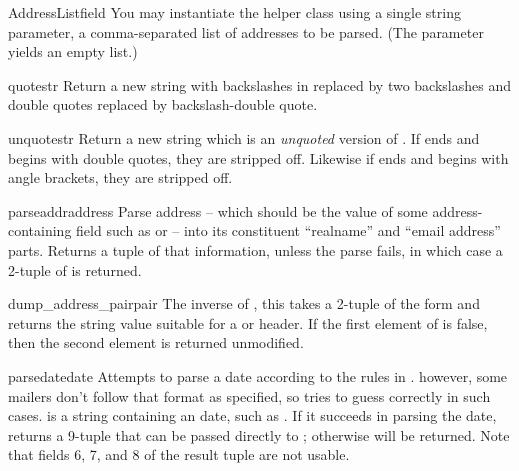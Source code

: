 \begin{classdesc}{AddressList}{field}
You may instantiate the  helper class using a single
string parameter, a comma-separated list of  addresses to be
parsed.  (The parameter  yields an empty list.)
\end{classdesc}

\begin{funcdesc}{quote}{str}
Return a new string with backslashes in  replaced by two
backslashes and double quotes replaced by backslash-double quote.
\end{funcdesc}

\begin{funcdesc}{unquote}{str}
Return a new string which is an \emph{unquoted} version of .
If  ends and begins with double quotes, they are stripped
off.  Likewise if  ends and begins with angle brackets, they
are stripped off.
\end{funcdesc}

\begin{funcdesc}{parseaddr}{address}
Parse address -- which should be the value of some address-containing
field such as  or  -- into its constituent
``realname'' and ``email address'' parts.  Returns a tuple of that
information, unless the parse fails, in which case a 2-tuple of
 is returned.
\end{funcdesc}

\begin{funcdesc}{dump_address_pair}{pair}
The inverse of , this takes a 2-tuple of the form
 and returns the string value suitable
for a  or  header.  If the first element of
 is false, then the second element is returned unmodified.
\end{funcdesc}

\begin{funcdesc}{parsedate}{date}
Attempts to parse a date according to the rules in .
however, some mailers don't follow that format as specified, so
 tries to guess correctly in such cases. 
 is a string containing an  date, such as 
.  If it succeeds in parsing
the date,  returns a 9-tuple that can be passed
directly to ; otherwise  will be
returned.  Note that fields 6, 7, and 8 of the result tuple are not
usable.
\end{funcdesc}

